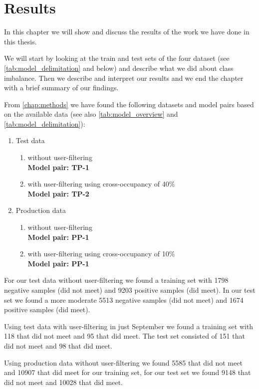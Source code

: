 \chapter{Results}
\label{chap:results}
In this chapter we will show and discuss the results of the work we have done in this thesis.

We will start by looking at the train and test sets of the four dataset (see \autoref{tab:model_delimitation} and below) and describe what we did about class imbalance. Then we describe and interpret our results and we end the chapter with a brief summary of our findings. 

From \autoref{chap:methods} we have found the following datasets and model pairs based on the available data (see also \autoref{tab:model_overview} and \autoref{tab:model_delimitation}):
\begin{enumerate}
\item Test data
\begin{enumerate}
\item without user-filtering \\\textbf{Model pair: TP-1}
\item with user-filtering using cross-occupancy of 40\% \\\textbf{Model pair: TP-2}
\end{enumerate}
\item Production data
\begin{enumerate}
\item without user-filtering \\\textbf{Model pair: PP-1}
\item with user-filtering using cross-occupancy of 10\% \\\textbf{Model pair: PP-1}
\end{enumerate}
\end{enumerate}


For our test data without user-filtering we found a training set with 1798 negative samples (did not meet) and 9203 positive samples (did meet). In our test set we found a more moderate 5513 negative samples (did not meet) and 1674 positive samples (did meet).

Using test data with user-filtering in just September we found a training set with 118 that did not meet and 95 that did meet. The test set consisted of 151 that did not meet and 98 that did meet. 

Using production data without user-filtering we found 5585 that did not meet and 10907 that did meet for our training set, for our test set we found 9148 that did not meet and 10028 that did meet.

